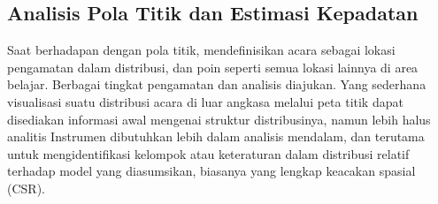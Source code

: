 \subsection{Analisis Pola Titik dan Estimasi Kepadatan}
Saat berhadapan dengan pola titik, mendefinisikan acara sebagai lokasi pengamatan dalam distribusi, dan poin seperti semua lokasi lainnya di area belajar. Berbagai tingkat pengamatan dan analisis diajukan. Yang sederhana visualisasi suatu distribusi acara di luar angkasa melalui peta titik dapat disediakan informasi awal mengenai struktur distribusinya, namun lebih halus analitis Instrumen dibutuhkan lebih dalam analisis mendalam, dan terutama untuk mengidentifikasi kelompok atau keteraturan dalam distribusi relatif terhadap model yang diasumsikan, biasanya yang lengkap keacakan spasial (CSR).
